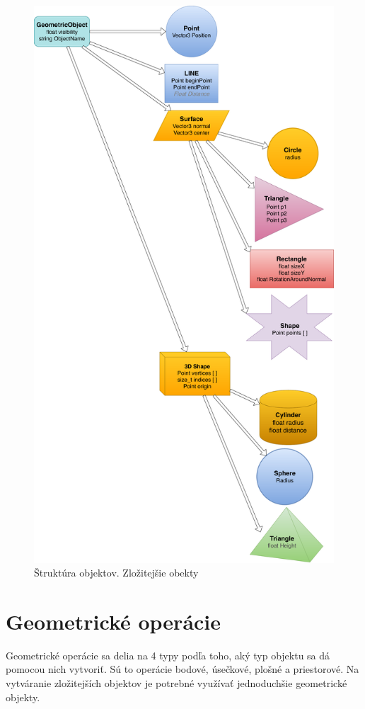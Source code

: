 \begin{figure}[H]
	\centering
	\includegraphics[height=\textheight]{obrazky-figures/Diagram/Draw/DP Navrh operacii-Structure.pdf}
	\caption{Štruktúra objektov. Zložitejšie obekty }
	\label{fig:1}
\end{figure}



\chapter{Geometrické operácie}
Geometrické operácie sa delia na 4 typy podľa toho, aký typ objektu sa dá pomocou nich vytvoriť. Sú to operácie bodové, úsečkové, plošné a priestorové. Na vytváranie zložitejších objektov je potrebné využívať jednoduchšie geometrické objekty. 


